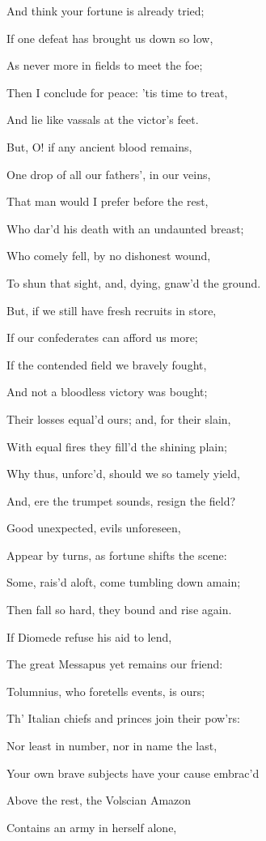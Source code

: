 And think your fortune is already tried;

If one defeat has brought us down so low,

As never more in fields to meet the foe;

Then I conclude for peace: ’tis time to treat,

And lie like vassals at the victor’s feet.

But, O! if any ancient blood remains,

One drop of all our fathers’, in our veins,

That man would I prefer before the rest,

Who dar’d his death with an undaunted breast;

Who comely fell, by no dishonest wound,

To shun that sight, and, dying, gnaw’d the ground.

But, if we still have fresh recruits in store,

If our confederates can afford us more;

If the contended field we bravely fought,

And not a bloodless victory was bought;

Their losses equal’d ours; and, for their slain,

With equal fires they fill’d the shining plain;

Why thus, unforc’d, should we so tamely yield,

And, ere the trumpet sounds, resign the field?

Good unexpected, evils unforeseen,

Appear by turns, as fortune shifts the scene:

Some, rais’d aloft, come tumbling down amain;

Then fall so hard, they bound and rise again.

If Diomede refuse his aid to lend,

The great Messapus yet remains our friend:

Tolumnius, who foretells events, is ours;

Th’ Italian chiefs and princes join their pow’rs:

Nor least in number, nor in name the last,

Your own brave subjects have your cause embrac’d

Above the rest, the Volscian Amazon

Contains an army in herself alone,

